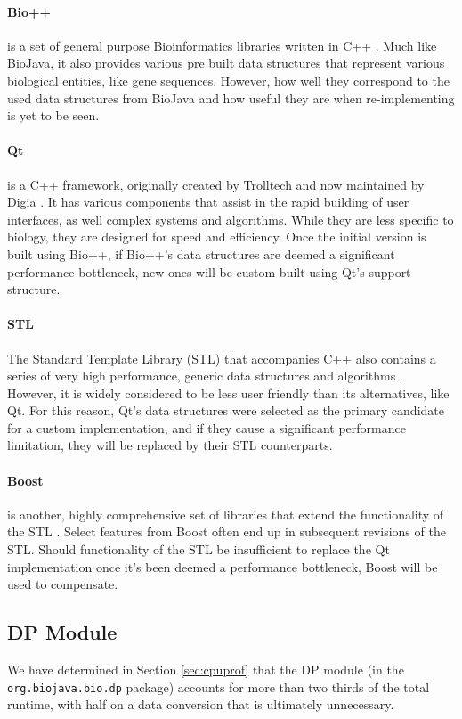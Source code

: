 \documentclass[a4paper,12pt]{report}
\begin{document}
\paragraph{Bio++}
is a set of general purpose Bioinformatics libraries written in C++ \autocite{bpp}. Much like BioJava, it also provides various pre built data structures that represent various biological entities, like gene sequences. However, how well they correspond to the used data structures from BioJava and how useful they are when re-implementing is yet to be seen.

\paragraph{Qt}
is a C++ framework, originally created by Trolltech and now maintained by Digia \autocite{qt}. It has various components that assist in the rapid building of user interfaces, as well complex systems and algorithms. While they are less specific to biology, they are designed for speed and efficiency. Once the initial version is built using Bio++, if Bio++'s data structures are deemed a significant performance bottleneck, new ones will be custom built using Qt's support structure.

\paragraph{STL}
The Standard Template Library (STL) that accompanies C++ also contains a series of very high performance, generic data structures and algorithms \autocite{stl}. However, it is widely considered to be less user friendly than its alternatives, like Qt. For this reason, Qt's data structures were selected as the primary candidate for a custom implementation, and if they cause a significant performance limitation, they will be replaced by their STL counterparts.

\paragraph{Boost}
is another, highly comprehensive set of libraries that extend the functionality of the STL \autocite{boost}. Select features from Boost often end up in subsequent revisions of the STL. Should functionality of the STL be insufficient to replace the Qt implementation once it's been deemed a performance bottleneck, Boost will be used to compensate.

\subsection{DP Module}
We have determined in Section \ref{sec:cpuprof} that the DP module (in the \texttt{org.biojava.bio.dp} package) accounts for more than two thirds of the total runtime, with half on a data conversion that is ultimately unnecessary.
\end{document}
